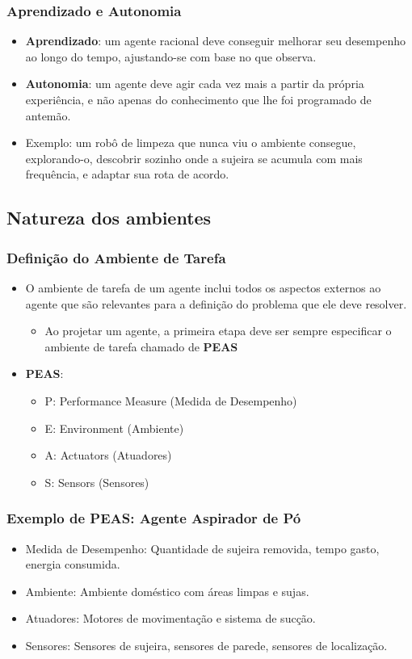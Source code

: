 \documentclass{beamer}
\begin{document}
\begin{frame}
\frametitle{Aprendizado e Autonomia}
\begin{itemize}
    \item \textbf{Aprendizado}: um agente racional deve conseguir melhorar seu desempenho ao longo do tempo, ajustando-se com base no que observa.
    \item \textbf{Autonomia}: um agente deve agir cada vez mais a partir da própria experiência, e não apenas do conhecimento que lhe foi programado de antemão.
    \item Exemplo: um robô de limpeza que nunca viu o ambiente consegue, explorando-o, descobrir sozinho onde a sujeira se acumula com mais frequência, e adaptar sua rota de acordo.
\end{itemize}
\end{frame}


\subsection{Natureza dos ambientes}
\begin{frame}
\frametitle{Definição do Ambiente de Tarefa}
\begin{itemize}
    \item O ambiente de tarefa de um agente inclui todos os aspectos externos ao agente que são relevantes para a definição do problema que ele deve resolver.
    \begin{itemize}
     \item Ao projetar um agente, a primeira etapa deve ser sempre especificar o ambiente de tarefa chamado de \textbf{PEAS}
    \end{itemize}
    \item \textbf{PEAS}:
    \begin{itemize}
        \item P: Performance Measure (Medida de Desempenho)
        \item E: Environment (Ambiente)
        \item A: Actuators (Atuadores)
        \item S: Sensors (Sensores)
    \end{itemize}
\end{itemize}
\end{frame}

\begin{frame}
\frametitle{Exemplo de PEAS: Agente Aspirador de Pó}
\begin{itemize}
    \item Medida de Desempenho: Quantidade de sujeira removida, tempo gasto, energia consumida.
    \item Ambiente: Ambiente doméstico com áreas limpas e sujas.
    \item Atuadores: Motores de movimentação e sistema de sucção.
    \item Sensores: Sensores de sujeira, sensores de parede, sensores de localização.
\end{itemize}

\end{frame}
\end{document}
